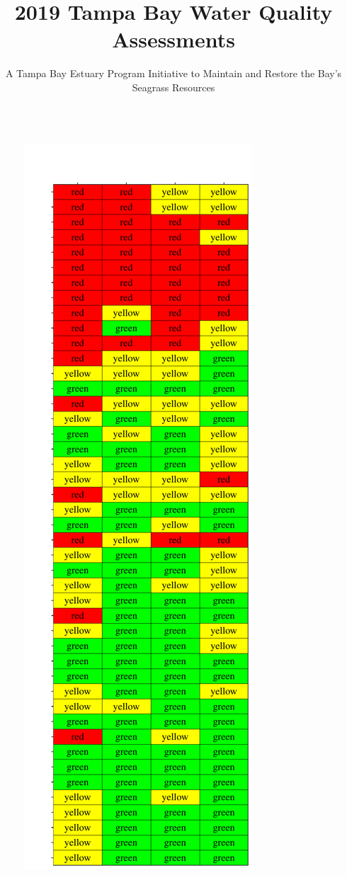 \documentclass[final,t]{beamer}\usepackage[]{graphicx}\usepackage[]{color}
\title{\Large 2019 Tampa Bay Water Quality Assessments}
\author{\normalsize A Tampa Bay Estuary Program Initiative to Maintain and Restore the Bay's Seagrass Resources}
\begin{document}
\begin{frame}

\vspace{-0.4cm} %
\begin{columns}[t]

\begin{column}{.34\linewidth}

\vspace{-0.2in}


\begin{figure}
\centerline{\includegraphics[trim = 0cm 0cm 0cm 0cm, width=1.1\linewidth]{figure/attainmat.pdf}}

\end{figure}
\end{column}
\end{columns}
\end{frame}
\end{document}
